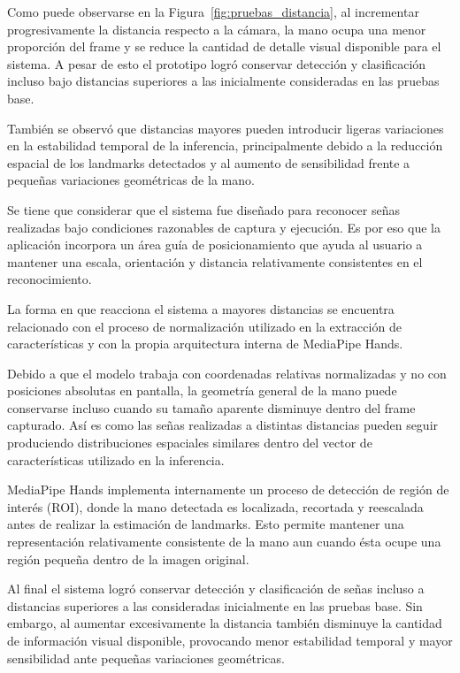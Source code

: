 	Como puede observarse en la Figura~\ref{fig:pruebas_distancia}, al incrementar progresivamente la distancia respecto a la cámara, la mano ocupa una menor proporción del frame y se reduce la cantidad de detalle visual disponible para el sistema. A pesar de esto el prototipo logró conservar detección y clasificación incluso bajo distancias superiores a las inicialmente consideradas en las pruebas base.
	
	También se observó que distancias mayores pueden introducir ligeras variaciones en la estabilidad temporal de la inferencia, principalmente debido a la reducción espacial de los landmarks detectados y al aumento de sensibilidad frente a pequeñas variaciones geométricas de la mano.
	
	Se tiene que considerar que el sistema fue diseñado para reconocer señas realizadas bajo condiciones razonables de captura y ejecución. Es por eso que la aplicación incorpora un área guía de posicionamiento que ayuda al usuario a mantener una escala, orientación y distancia relativamente consistentes en el reconocimiento.
	
	La forma en que reacciona el sistema a mayores distancias se encuentra relacionado con el proceso de normalización utilizado en la extracción de características y con la propia arquitectura interna de MediaPipe Hands.
	
	Debido a que el modelo trabaja con coordenadas relativas normalizadas y no con posiciones absolutas en pantalla, la geometría general de la mano puede conservarse incluso cuando su tamaño aparente disminuye dentro del frame capturado. Así es como las señas realizadas a distintas distancias pueden seguir produciendo distribuciones espaciales similares dentro del vector de características utilizado en la inferencia.
	
	MediaPipe Hands implementa internamente un proceso de detección de región de interés (ROI), donde la mano detectada es localizada, recortada y reescalada antes de realizar la estimación de landmarks. Esto permite mantener una representación relativamente consistente de la mano aun cuando ésta ocupe una región pequeña dentro de la imagen original.
	
	Al final el sistema logró conservar detección y clasificación de señas incluso a distancias superiores a las consideradas inicialmente en las pruebas base. Sin embargo, al aumentar excesivamente la distancia también disminuye la cantidad de información visual disponible, provocando menor estabilidad temporal y mayor sensibilidad ante pequeñas variaciones geométricas.
	
